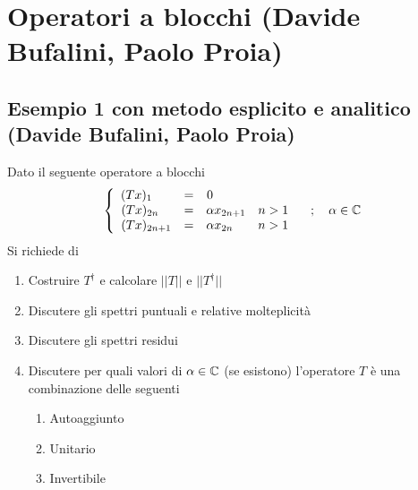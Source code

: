 \newpage

\section{Operatori a blocchi (Davide Bufalini, Paolo Proia)}
\subsection{Esempio 1 con metodo esplicito e analitico (Davide Bufalini, Paolo Proia)}
Dato il seguente operatore a blocchi
\begin{align}
	\left\{ \begin{array}{ccc} (Tx)_1 \quad\;\; &= &0 \qquad \qquad \qquad\\ (Tx)_{2n} \quad &= &\alpha x_{2n+1} \quad n> 1\\ (Tx)_{2n+1} &= &\alpha x_{2n} \quad\quad n> 1 \end{array} \right. \quad ; \quad \alpha \in \mathbb{C}
\end{align}
Si richiede di
\begin{enumerate}
	\item Costruire $T^\dagger$ e calcolare $||T||$ e  $||T^\dagger||$
	\item Discutere gli spettri puntuali e relative molteplicità
	\item Discutere gli spettri residui
	\item Discutere per quali valori di $\alpha \in \mathbb{C}$ (se esistono) l'operatore $T$ è una combinazione delle seguenti
	\begin{enumerate}
		\item Autoaggiunto
		\item Unitario
		\item Invertibile
	\end{enumerate}
\end{enumerate}

